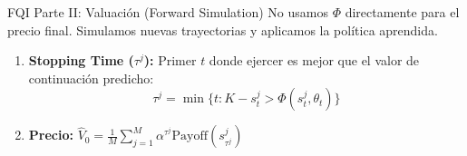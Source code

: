 \documentclass[xcolor=dvipsnames, handout]{beamer}
\begin{document}
\begin{frame}{FQI Parte II: Valuación (Forward Simulation)}
No usamos $\Phi$ directamente para el precio final. Simulamos nuevas trayectorias y aplicamos la política aprendida.

\begin{center}
\end{center}

\begin{enumerate}
    \item \textbf{Stopping Time ($\tau^j$):} Primer $t$ donde ejercer es mejor que el valor de continuación predicho:
    \[ \tau^j = \min \{ t : K - s_t^j > \Phi(s_t^j, \theta_t) \} \]
    \item \textbf{Precio:} $\hat{V}_0 = \frac{1}{M} \sum_{j=1}^M \alpha^{\tau^j} \text{Payoff}(s_{\tau^j}^j)$
\end{enumerate}
\end{frame}
\end{document}
